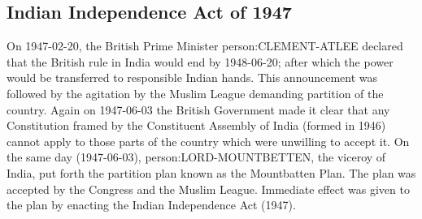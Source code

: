 \subsection{Indian Independence Act of 1947}

On 1947-02-20, the British Prime Minister \gls{person:CLEMENT-ATLEE} declared that the British rule in India would end by 1948-06-20; after which the power would be transferred to responsible Indian hands. This announcement was followed by the agitation by the Muslim League demanding partition of the country. Again on 1947-06-03 the British Government made it clear that any Constitution framed by the Constituent Assembly of India (formed in 1946) cannot apply to those parts of the country which were unwilling to accept it. On the same day (1947-06-03), \gls{person:LORD-MOUNTBETTEN}, the viceroy of India, put forth the partition plan known as the Mountbatten Plan. The plan was accepted by the Congress and the Muslim League. Immediate effect was given to the plan by enacting the Indian Independence Act (1947).

